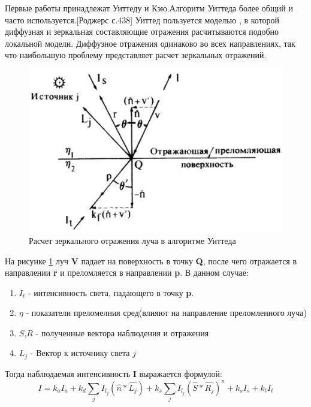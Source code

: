 \documentclass[a4paper,14pt, unknownkeysallowed]{extreport}
\begin{document}
Первые работы принадлежат Уиттеду и Кэю.Алгоритм Уиттеда более общий и часто используется.[Роджерс с.438]
Уиттед пользуется моделью , в которой диффузная и зеркальная составляющие отражения расчитываются подобно локальной модели.
Диффузное отражения одинаково во всех направлениях, так что наибольшую проблему представляет расчет зеркальных отражений.\cite{Rodgers}

\begin{figure}[h]
	\centering
	\includegraphics{global_reflections.jpg}
	\caption{Расчет зеркального отражения луча в алгоритме Уиттеда}
	\label{fig:global_reflections}
\end{figure} 

На рисунке  \ref{fig:global_reflections} луч \textbf{V} падает на поверхность в точку \textbf{Q}, после чего отражается в направлении \textbf{r} и преломляется
в направлении \textbf{p}.
В данном случае:
\begin{enumerate}
	\item $I_t$ - интенсивность света, падающего в точку \textbf{p}.
	\item $\eta$ - показатели преломелния сред(влияют на направление преломленного луча)
	\item $S$,$R$ - полученные вектора наблюдения и отражения
	\item $L_j$ - Вектор к источнику света $j$

\end{enumerate}

Тогда наблюдаемая интенсивность \textbf{I} выражается формулой:
\begin{equation} 
	I = k_aI_a + k_d \sum_{j} I_{l_j}(\hat{n} * \hat{L_j}) + k_s \sum_{j} I_{l_j}(\hat{S} * \hat{R_j})^n + k_sI_s + k_tI_t
	\label{eq:intensivity}
\end{equation}
\end{document}
